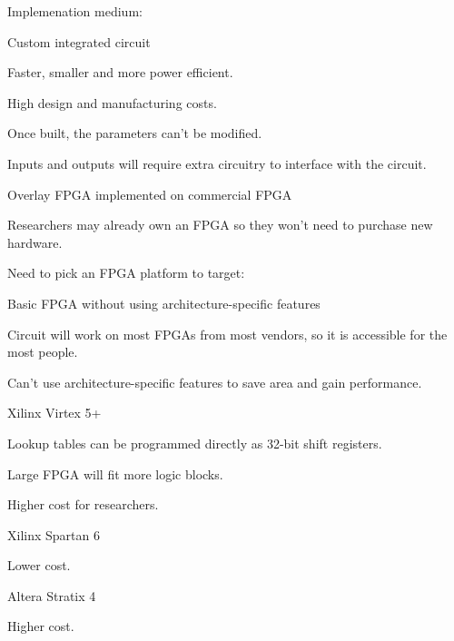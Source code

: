 Implemenation medium:
\begin{enumeration}
\item Custom integrated circuit \
	\begin{itemlist}
		\item Faster, smaller and more power efficient.
		\item High design and manufacturing costs.
		\item Once built, the parameters can't be modified.
		\item Inputs and outputs will require extra circuitry to interface with the circuit.
	\end{itemlist}
\item Overlay FPGA implemented on commercial FPGA \
	\begin{itemlist}
		\item Researchers may already own an FPGA so they won't need to purchase new hardware.
		\item Need to pick an FPGA platform to target:
		\begin{enumeration}
			\item Basic FPGA without using architecture-specific features
				\begin{itemlist}
					\item Circuit will work on most FPGAs from most vendors, so it is accessible for the most people.
					\item Can't use architecture-specific features to save area and gain performance.
				\end{itemlist}
			\item Xilinx Virtex 5+ \
				\begin{itemlist}
					\item Lookup tables can be programmed directly as 32-bit shift registers.
					\item Large FPGA will fit more logic blocks.
					\item Higher cost for researchers.
				\end{itemlist}
			\item Xilinx Spartan 6  \
				\begin{itemlist}
					\item Lower cost.
					\item {}
				\end{itemlist}
			\item Altera Stratix 4 
				\begin{itemlist}
					\item Higher cost.
					\item {}
				\end{itemlist}
		\end{enumeration}
	\end{itemlist}
\end{enumeration}

